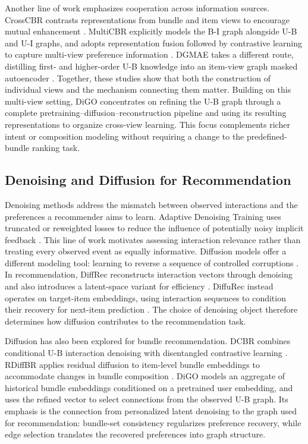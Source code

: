 Another line of work emphasizes cooperation across information sources. CrossCBR contrasts representations from bundle and item views to encourage mutual enhancement \cite{ma2022crosscbr}. MultiCBR explicitly models the B-I graph alongside U-B and U-I graphs, and adopts representation fusion followed by contrastive learning to capture multi-view preference information \cite{ma2024multicbr}. DGMAE takes a different route, distilling first- and higher-order U-B knowledge into an item-view graph masked autoencoder \cite{ren2023dgmae}. Together, these studies show that both the construction of individual views and the mechanism connecting them matter. Building on this multi-view setting, DiGO concentrates on refining the U-B graph through a complete pretraining--diffusion--reconstruction pipeline and using its resulting representations to organize cross-view learning. This focus complements richer intent or composition modeling without requiring a change to the predefined-bundle ranking task.

\subsection{Denoising and Diffusion for Recommendation}

Denoising methods address the mismatch between observed interactions and the preferences a recommender aims to learn. Adaptive Denoising Training uses truncated or reweighted losses to reduce the influence of potentially noisy implicit feedback \cite{wang2021adt}. This line of work motivates assessing interaction relevance rather than treating every observed event as equally informative. Diffusion models offer a different modeling tool: learning to reverse a sequence of controlled corruptions \cite{ho2020ddpm}. In recommendation, DiffRec reconstructs interaction vectors through denoising and also introduces a latent-space variant for efficiency \cite{wang2023diffrec}. DiffuRec instead operates on target-item embeddings, using interaction sequences to condition their recovery for next-item prediction \cite{li2023diffurec}. The choice of denoising object therefore determines how diffusion contributes to the recommendation task.

Diffusion has also been explored for bundle recommendation. DCBR combines conditional U-B interaction denoising with disentangled contrastive learning \cite{li2025dcbr}. RDiffBR applies residual diffusion to item-level bundle embeddings to accommodate changes in bundle composition \cite{zhang2026rdiffbr}. DiGO models an aggregate of historical bundle embeddings conditioned on a pretrained user embedding, and uses the refined vector to select connections from the observed U-B graph. Its emphasis is the connection from personalized latent denoising to the graph used for recommendation: bundle-set consistency regularizes preference recovery, while edge selection translates the recovered preferences into graph structure.

